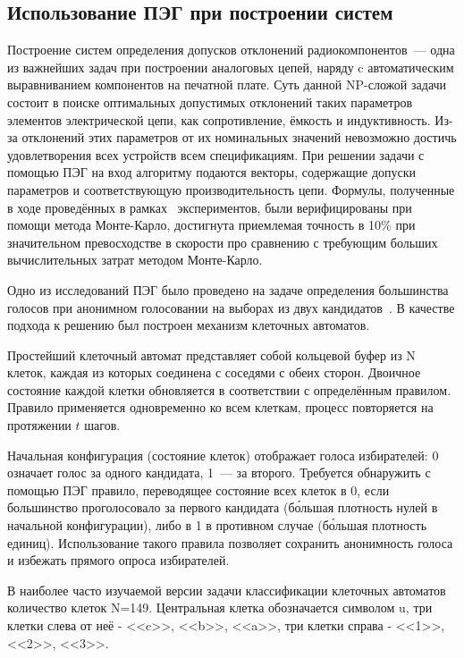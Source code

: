 \subsection{Использование ПЭГ при построении систем}

Построение систем определения допусков отклонений радиокомпонентов~--- одна из важнейших задач при построении аналоговых цепей, наряду c автоматическим выравниванием компонентов на печатной плате. Суть данной NP-сложой задачи состоит в поиске оптимальных допустимых отклонений таких параметров элементов электрической цепи, как сопротивление, ёмкость и индуктивность. Из-за отклонений этих параметров от их номинальных значений невозможно достичь удовлетворения всех устройств всем спецификациям. При решении задачи с помощью ПЭГ на вход алгоритму подаются векторы, содержащие допуски параметров и соответствующую производительность цепи. Формулы, полученные в ходе проведённых в рамках~\cite{DT_ICSES} экспериментов, были верифицированы при помощи метода Монте-Карло, достигнута приемлемая точность в 10\% при значительном превосходстве в скорости про сравнению с требующим больших вычислительных затрат методом Монте-Карло.

Одно из исследований ПЭГ было проведено на задаче определения большинства голосов при анонимном голосовании на выборах из двух кандидатов~\cite{conf/eurogp/Ferreira02}. В качестве подхода к решению был построен механизм клеточных автоматов.

Простейший клеточный автомат представляет собой кольцевой буфер из N клеток, каждая из которых соединена с соседями с обеих сторон. Двоичное состояние каждой клетки обновляется в соответствии с определённым правилом. Правило применяется одновременно ко всем клеткам, процесс повторяется на протяжении $t$ шагов.

Начальная конфигурация (состояние клеток) отображает голоса избирателей: 0 означает голос за одного кандидата, 1~--- за второго. Требуется обнаружить с помощью ПЭГ правило, переводящее состояние всех клеток в 0, если большинство проголосовало за первого кандидата (б\'{о}льшая плотность нулей в начальной конфигурации), либо в 1 в противном случае (б\'{о}льшая плотность единиц). Использование такого правила позволяет сохранить анонимность голоса и избежать прямого опроса избирателей.

В наиболее часто изучаемой версии задачи классификации клеточных автоматов количество клеток N=149. Центральная клетка обозначается символом u, три клетки слева от неё - <<c>>, <<b>>, <<a>>, три клетки справа - <<1>>, <<2>>, <<3>>.

